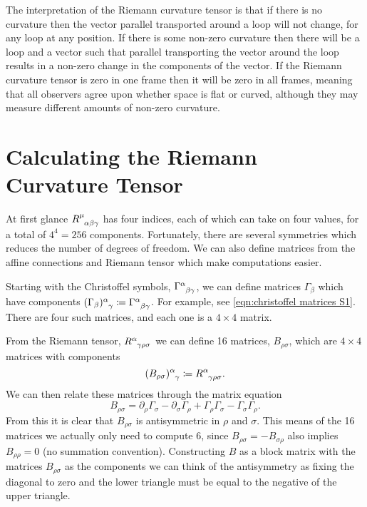 \documentclass[fleqn]{NotesClass}
\newcommand*{\christoffel}[3]{\tensor{\Gamma}{^{#1}_{{#2}{#3}}}}
\begin{document}
    The interpretation of the Riemann curvature tensor is that if there is no curvature then the vector parallel transported around a loop will not change, for any loop at any position.
    If there is some non-zero curvature then there will be a loop and a vector such that parallel transporting the vector around the loop results in a non-zero change in the components of the vector.
    If the Riemann curvature tensor is zero in one frame then it will be zero in all frames, meaning that all observers agree upon whether space is flat or curved, although they may measure different amounts of non-zero curvature.
    
    \section{Calculating the Riemann Curvature Tensor}
    At first glance \(\tensor{R}{^\mu_{\alpha\beta\gamma}}\) has four indices, each of which can take on four values, for a total of \(4^4 = 256\) components.
    Fortunately, there are several symmetries which reduces the number of degrees of freedom.
    We can also define matrices from the affine connections and Riemann tensor which make computations easier.
    
    Starting with the Christoffel symbols, \(\christoffel{\alpha}{\beta}{\gamma}\), we can define matrices \(\Gamma_\beta\) which have components \(\tensor{(\Gamma_\beta)}{^\alpha_\gamma} \coloneqq \christoffel{\alpha}{\beta}{\gamma}\).
    For example, see \cref{eqn:christoffel matrices S1}.
    There are four such matrices, and each one is a \(4 \times 4\) matrix.
    
    From the Riemann tensor, \(\tensor{R}{^\alpha_{\gamma\rho\sigma}}\) we can define 16 matrices, \(B_{\rho\sigma}\), which are \(4\times 4\) matrices with components
    \begin{equation}
        \tensor{(B_{\rho\sigma})}{^\alpha_\gamma} \coloneqq \tensor{R}{^\alpha_{\gamma\rho\sigma}}.
    \end{equation}
    We can then relate these matrices through the matrix equation
    \begin{equation}
        B_{\rho\sigma} = \partial_\rho \Gamma_\sigma - \partial_\sigma \Gamma_\rho + \Gamma_\rho \Gamma_\sigma - \Gamma_\sigma \Gamma_\rho.
    \end{equation}
    From this it is clear that \(B_{\rho\sigma}\) is antisymmetric in \(\rho\) and \(\sigma\).
    This means of the 16 matrices we actually only need to compute 6, since \(B_{\rho\sigma} = -B_{\sigma\rho}\) also implies \(B_{\rho\rho} = 0\) (no summation convention).
    Constructing \(B\) as a block matrix with the matrices \(B_{\rho\sigma}\) as the components we can think of the antisymmetry as fixing the diagonal to zero and the lower triangle must be equal to the negative of the upper triangle.
    
\end{document}
